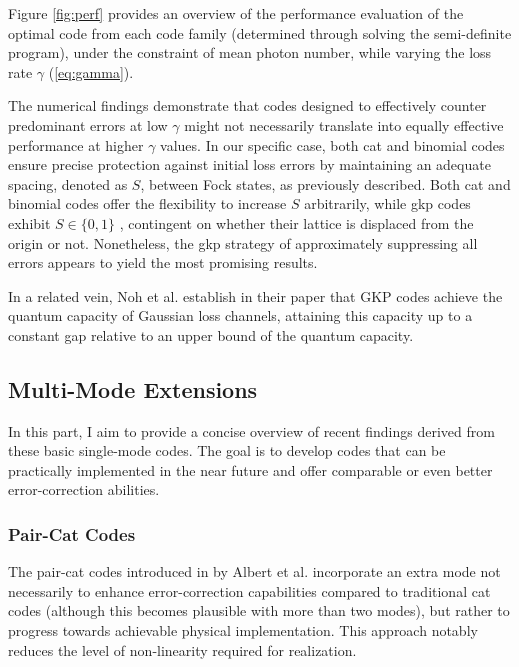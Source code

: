 \documentclass[11pt]{article}
\newcommand\0{\mathbf{0}}
\newcommand\<{\langle}
\renewcommand\>{\rangle}
\begin{document}
Figure \ref{fig:perf} provides an overview of the performance evaluation of the optimal code from each code family (determined through solving the semi-definite program), under the constraint of mean photon number, while varying the loss rate $\gamma$ (\ref{eq:gamma}).

The numerical findings demonstrate that codes designed to effectively counter predominant errors at low $\gamma$ might not necessarily translate into equally effective performance at higher $\gamma$ values. In our specific case, both cat and binomial codes ensure precise protection against initial loss errors by maintaining an adequate spacing, denoted as $S$, between Fock states, as previously described. Both cat and binomial codes offer the flexibility to increase $S$ arbitrarily, while gkp codes exhibit $S \in \{0, 1\}$ \cite{albert2017performance}, contingent on whether their lattice is displaced from the origin or not. Nonetheless, the gkp strategy of approximately suppressing all errors appears to yield the most promising results.

In a related vein, Noh et al. establish in their paper \cite{noh2018improved} that GKP codes achieve the quantum capacity of Gaussian loss channels, attaining this capacity up to a constant gap relative to an upper bound of the quantum capacity.

\subsection{Multi-Mode Extensions}

In this part, I aim to provide a concise overview of recent findings derived from these basic single-mode codes. The goal is to develop codes that can be practically implemented in the near future and offer comparable or even better error-correction abilities.

\subsubsection{Pair-Cat Codes}\label{sec:multi-cat}

The pair-cat codes introduced in \cite{albert2018multimode} by Albert et al. incorporate an extra mode not necessarily to enhance error-correction capabilities compared to traditional cat codes (although this becomes plausible with more than two modes), but rather to progress towards achievable physical implementation. This approach notably reduces the level of non-linearity required for realization.
\end{document}
